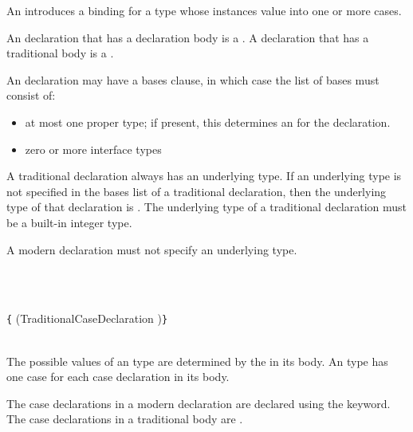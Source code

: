 An  introduces a binding for a type whose instances value into one or more cases.

An  declaration that has a declaration body is a .
A  declaration that has a traditional  body is a .

An  declaration may have a bases clause, in which case the list of bases must consist of:

\begin{itemize}
\item at most one proper type; if present, this determines an  for the  declaration.
\item zero or more interface types
\end{itemize}

A traditional  declaration always has an underlying type.
If an underlying type is not specified in the bases list of a traditional  declaration, then the underlying type of that declaration is .
The underlying type of a traditional  declaration must be a built-in integer type.

A modern  declaration must not specify an underlying type.


\begin{Syntax}
     \\
          \SynOpt
        
     \\
        \lstinline|{| (TraditionalCaseDeclaration \code{,})\SynStar \lstinline|}| \\

     \\
         \SynOpt
\end{Syntax}

The possible values of an  type are determined by the  in its body.
An  type has one case for each case declaration in its body.

The case declarations in a modern  declaration are declared using the  keyword.
The case declarations in a traditional  body are .

